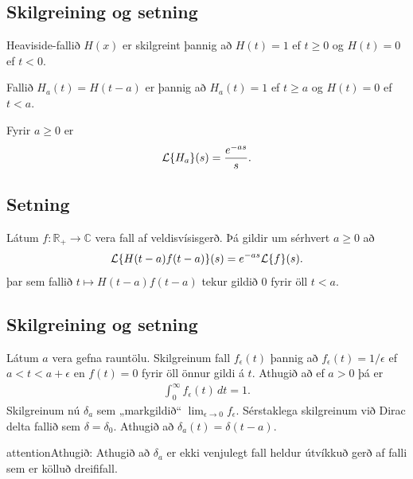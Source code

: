 \documentclass[a4paper,10pt,icelandic]{sphinxmanual}
\begin{document}
\subsection{Skilgreining og setning}
\label{\detokenize{Kafli10:skilgreining-og-setning}}
Heaviside-fallið \(H(x)\) er skilgreint þannig að \(H(t)=1\) ef \(t\geq 0\) og \(H(t)=0\) ef \(t<0\).

Fallið \(H_a(t)=H(t-a)\) er þannig að \(H_a(t)=1\) ef \(t\geq a\) og \(H(t)=0\) ef \(t<a\).

Fyrir \(a\geq 0\) er
\begin{equation*}
\begin{split}{\cal L}\{H_a\}(s)=\frac{e^{-as}}{s}.\end{split}
\end{equation*}

\subsection{Setning}
\label{\detokenize{Kafli10:setning}}
Látum \(f:\mathbb{R}_+\to {\mathbb{C}}\) vera fall af veldisvísisgerð. Þá gildir um sérhvert \(a\geq 0\) að
\begin{equation*}
\begin{split}{\cal L}\{H(t-a)f(t-a)\}(s) = e^{-as}{\cal L}\{f\}(s).\end{split}
\end{equation*}
þar sem fallið \(t\mapsto H(t-a)f(t-a)\) tekur gildið \(0\) fyrir öll \(t<a\).


\subsection{Skilgreining og setning}
\label{\detokenize{Kafli10:id3}}
Látum \(a\) vera gefna rauntölu. Skilgreinum fall \(f_\epsilon(t)\) þannig að \(f_\epsilon(t)=1/\epsilon\) ef \(a<t<a+\epsilon\) en \(f(t)=0\) fyrir öll önnur gildi á \(t\). Athugið að ef \(a>0\) þá er
\begin{equation*}
\begin{split}\int_0^\infty f_\epsilon(t)\,dt=1.\end{split}
\end{equation*}
Skilgreinum nú \(\delta_a\) sem „markgildið“ \(\lim_{\epsilon\to 0}f_\epsilon\). Sérstaklega skilgreinum við Dirac delta fallið sem \(\delta=\delta_0\). Athugið að \(\delta_a(t)=\delta(t-a)\).

\begin{sphinxadmonition}{attention}{Athugið:}
Athugið að \(\delta_a\) er ekki venjulegt fall heldur útvíkkuð gerð af falli sem er kölluð dreififall.
\end{sphinxadmonition}
\end{document}
